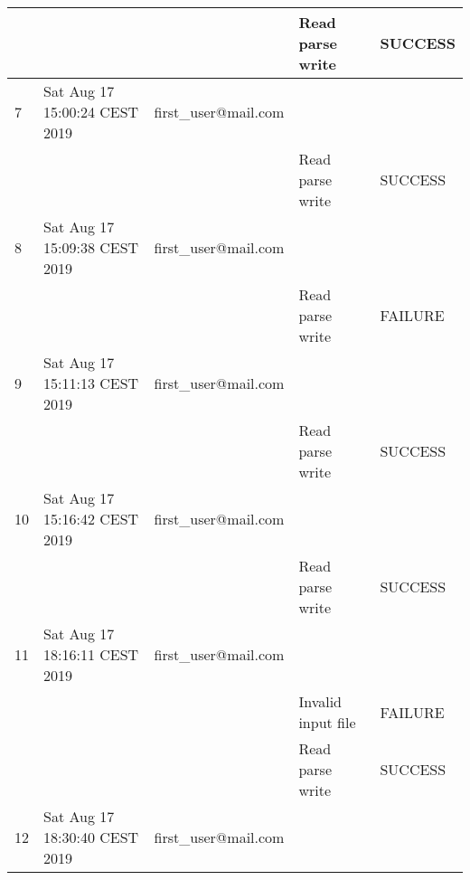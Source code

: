 \begin{table}[H]
{\begin{tabular}{|l|l|l|l|l|}
    &       &                                            & Read parse write                            & SUCCESS                                \\ \hline
    7 &     Sat Aug 17 15:00:24 CEST 2019        & first\_user@mail.com            &                                             &                                        \\ \hline
    &       &                                            & Read parse write                            & SUCCESS                                \\ \hline
    8 &      Sat Aug 17 15:09:38 CEST 2019        & first\_user@mail.com            &                                             &                                        \\ \hline
    &       &                                            & Read parse write                            & FAILURE                                \\ \hline
    9 &     Sat Aug 17 15:11:13 CEST 2019        & first\_user@mail.com            &                                             &                                        \\ \hline
    &       &                                            & Read parse write                            & SUCCESS                                \\ \hline
    10 &    Sat Aug 17 15:16:42 CEST 2019        & first\_user@mail.com            &                                             &                                        \\ \hline
    &       &                                            & Read parse write                            & SUCCESS                                \\ \hline
    11 &    Sat Aug 17 18:16:11 CEST 2019        & first\_user@mail.com            &                                             &                                        \\ \hline
    &       &                                            & Invalid input file                          & FAILURE                                \\ \hline
    &       &                                            & Read parse write                            & SUCCESS                                \\ \hline
    12 &    Sat Aug 17 18:30:40 CEST 2019        & first\_user@mail.com            &                                             &                                        \\ \hline

\end{tabular}}
\end{table}
